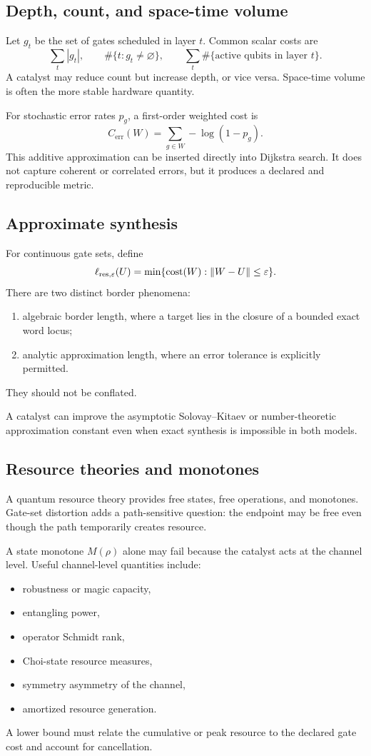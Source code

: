 \subsection{Depth, count, and space-time volume}
Let $g_t$ be the set of gates scheduled in layer $t$.  Common scalar costs are
\[
\sum_t |g_t|,
\qquad
\#\{t:g_t\ne\varnothing\},
\qquad
\sum_t \#\{\text{active qubits in layer }t\}.
\]
A catalyst may reduce count but increase depth, or vice versa.  Space-time volume is often the more stable hardware quantity.

For stochastic error rates $p_g$, a first-order weighted cost is
\[
C_{\mathrm{err}}(W)=\sum_{g\in W}-\log(1-p_g).
\]
This additive approximation can be inserted directly into Dijkstra search.  It does not capture coherent or correlated errors, but it produces a declared and reproducible metric.

\subsection{Approximate synthesis}
For continuous gate sets, define
\[
\ell_{\mathrm{res},\varepsilon}(U)
=
\min\{\operatorname{cost}(W):\|W-U\|\le\varepsilon\}.
\]
There are two distinct border phenomena:
\begin{enumerate}
\item algebraic border length, where a target lies in the closure of a bounded exact word locus;
\item analytic approximation length, where an error tolerance is explicitly permitted.
\end{enumerate}
They should not be conflated.

A catalyst can improve the asymptotic Solovay--Kitaev or number-theoretic approximation constant even when exact synthesis is impossible in both models.

\subsection{Resource theories and monotones}
A quantum resource theory provides free states, free operations, and monotones.  Gate-set distortion adds a path-sensitive question: the endpoint may be free even though the path temporarily creates resource.

A state monotone $M(\rho)$ alone may fail because the catalyst acts at the channel level.  Useful channel-level quantities include:
\begin{itemize}
\item robustness or magic capacity,
\item entangling power,
\item operator Schmidt rank,
\item Choi-state resource measures,
\item symmetry asymmetry of the channel,
\item amortized resource generation.
\end{itemize}
A lower bound must relate the cumulative or peak resource to the declared gate cost and account for cancellation.

